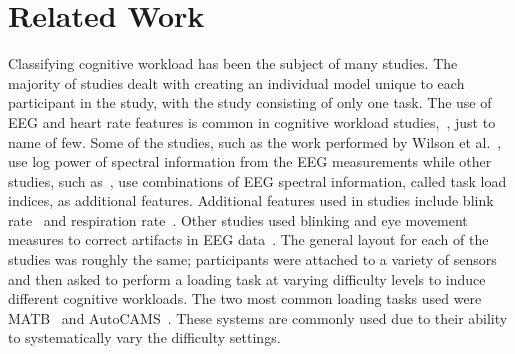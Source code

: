\documentclass[11pt]{article}
\begin{document}
\section{Related Work}
Classifying cognitive workload has been the subject of many studies. The majority of studies dealt with creating an individual model unique to each participant in the study, with the study consisting of only one task. The use of EEG and heart rate features is common in cognitive workload studies,~\cite{Wang_R, Zhang, Wilson, Yang}, just to name of few. Some of the studies, such as the work performed by Wilson et al.~\cite{Wilson}, use log power of spectral information from the EEG measurements while other studies, such as~\cite{Zhang}, use combinations of EEG spectral information, called task load indices, as additional features. Additional features used in studies include blink rate~\cite{Wilson, Wilson_2002} and respiration rate~\cite{Wilson_2003}. Other studies used blinking and eye movement measures to correct artifacts in EEG data~\cite{Wang_R}. The general layout for each of the studies was roughly the same; participants were attached to a variety of sensors and then asked to perform a loading task at varying difficulty levels to induce different cognitive workloads. The two most common loading tasks used were MATB~\cite{Estepp} and AutoCAMS~\cite{Lorenz}. These systems are commonly used due to their ability to systematically vary the difficulty settings. 
\end{document}
